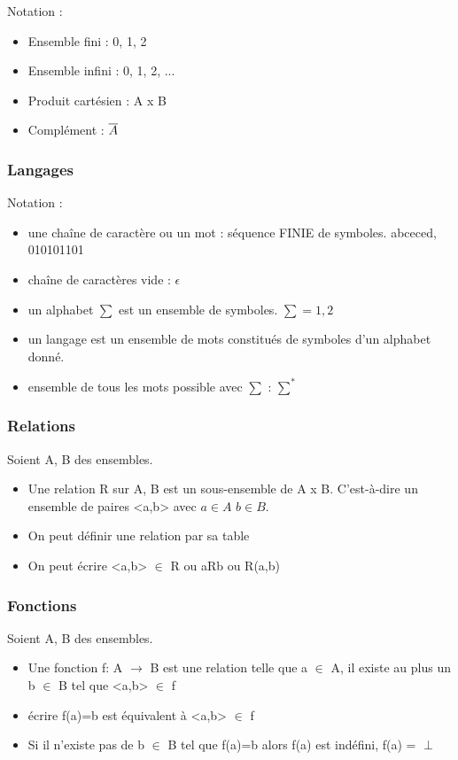 Notation : 
\begin{itemize}
	\item Ensemble fini : { 0, 1, 2}
	\item Ensemble infini : { 0, 1, 2, ...}
	\item Produit cartésien : A x B
	\item Complément : $\overline{A}$
\end{itemize}


\subsubsection{Langages}
\label{ssub:Langages}
Notation : 
\begin{itemize}
	\item une chaîne de caractère ou un mot : séquence FINIE de symboles. 
		abceced, 010101101
	\item chaîne de caractères vide : $\epsilon$
	\item un alphabet $\sum$ est un ensemble de symboles. $\sum = {1, 2}$
	\item un langage est un ensemble de mots constitués de symboles d'un alphabet
		donné.
	\item ensemble de tous les mots possible avec $\sum$ : $\sum ^*$
\end{itemize}


\subsubsection{Relations}
\label{ssub:relations}
Soient A, B des ensembles.
\begin{itemize}
	\item Une relation R sur A, B est un sous-ensemble de A x B. C'est-à-dire
		un ensemble de paires <a,b> avec $a\in A$ $b\in B$.
	\item On peut définir une relation par sa table
	\item On peut écrire <a,b> $\in$ R ou aRb ou R(a,b) 
\end{itemize}


\subsubsection{Fonctions}
\label{ssub:fonctions}
Soient A, B des ensembles.
\begin{itemize}
	\item Une fonction f: A $\rightarrow$ B est une relation telle que a $\in$
	A, il existe au plus un b $\in$ B tel que <a,b> $\in$ f
	\item écrire f(a)=b est équivalent à <a,b> $\in$ f
	\item Si il n'existe pas de b $\in$ B tel que f(a)=b alors f(a) est indéfini,
		f(a) = $\perp$
\end{itemize}

